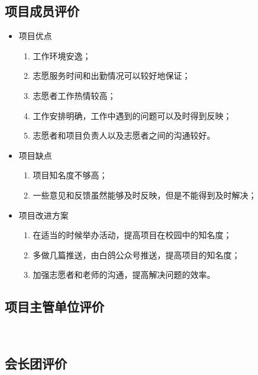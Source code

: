 \documentclass[nocover]{lizhechen}
\begin{document}
	\subsection{项目成员评价}
	\begin{itemize}
		\item 项目优点
		\begin{enumerate}
			\item 工作环境安逸；
			\item 志愿服务时间和出勤情况可以较好地保证；
			\item 志愿者工作热情较高；
			\item 工作安排明确，工作中遇到的问题可以及时得到反映；
			\item 志愿者和项目负责人以及志愿者之间的沟通较好。
		\end{enumerate}
		
		\item 项目缺点
		\begin{enumerate}
			\item 项目知名度不够高；
			\item 一些意见和反馈虽然能够及时反映，但是不能得到及时解决；
			
		\end{enumerate}
		
		\item 项目改进方案
		\begin{enumerate}
			\item 在适当的时候举办活动，提高项目在校园中的知名度；
			\item 多做几篇推送，由白鸽公众号推送，提高项目的知名度；
			\item 加强志愿者和老师的沟通，提高解决问题的效率。
		\end{enumerate}
		
	\end{itemize}
	
	\subsection{项目主管单位评价}
	\par \ 
	\\[17ex]
	
	\subsection{会长团评价}
	\par \ 
	\\[20ex]
		
\end{document}
